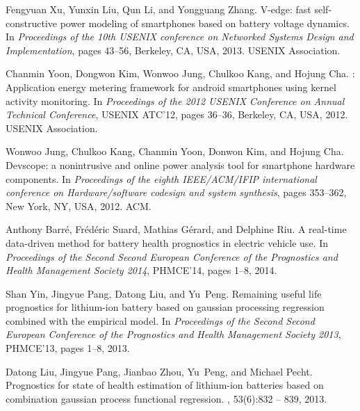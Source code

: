 \documentclass[journal]{IEEEtran}
\begin{document}
\begin{thebibliography}{10}
Fengyuan Xu, Yunxin Liu, Qun Li, and Yongguang Zhang.
\newblock V-edge: fast self-constructive power modeling of smartphones based on
  battery voltage dynamics.
\newblock In {\em Proceedings of the 10th USENIX conference on Networked
  Systems Design and Implementation}, pages 43--56, Berkeley, CA, USA, 2013.
  USENIX Association.

Chanmin Yoon, Dongwon Kim, Wonwoo Jung, Chulkoo Kang, and Hojung Cha.
: Application energy metering framework for android
  smartphones using kernel activity monitoring.
\newblock In {\em Proceedings of the 2012 USENIX Conference on Annual Technical
  Conference}, USENIX ATC'12, pages 36--36, Berkeley, CA, USA, 2012. USENIX
  Association.

Wonwoo Jung, Chulkoo Kang, Chanmin Yoon, Donwon Kim, and Hojung Cha.
\newblock Devscope: a nonintrusive and online power analysis tool for
  smartphone hardware components.
\newblock In {\em Proceedings of the eighth IEEE/ACM/IFIP international
  conference on Hardware/software codesign and system synthesis}, pages
  353--362, New York, NY, USA, 2012. ACM.

Anthony Barr{\'{e}}, Fr{\'{e}}d{\'{e}}ric Suard, Mathias G{\'{e}}rard, and
  Delphine Riu.
\newblock A real-time data-driven method for battery health prognostics in
  electric vehicle use.
\newblock In {\em Proceedings of the Second Second European Conference of the
  Prognostics and Health Management Society 2014}, PHMCE'14, pages 1--8, 2014.

Shan Yin, Jingyue Pang, Datong Liu, and Yu~Peng.
\newblock Remaining useful life prognostics for lithium-ion battery based on
  gaussian processing regression combined with the empirical model.
\newblock In {\em Proceedings of the Second Second European Conference of the
  Prognostics and Health Management Society 2013}, PHMCE'13, pages 1--8, 2013.

Datong Liu, Jingyue Pang, Jianbao Zhou, Yu~Peng, and Michael Pecht.
\newblock Prognostics for state of health estimation of lithium-ion batteries
  based on combination gaussian process functional regression.
, 53(6):832 -- 839, 2013.

\end{thebibliography}
\end{document}
